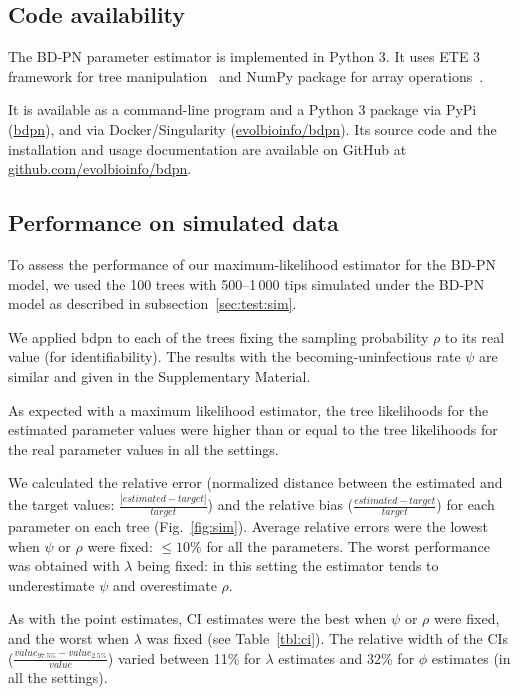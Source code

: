 \documentclass[a4paper,10pt]{article}
\begin{document}
\subsection*{Code availability}
The BD-PN parameter estimator is implemented in Python 3. It uses ETE 3 framework for tree manipulation~\citep{Huerta-Cepas2016} and NumPy package for array operations~\citep{harris_array_2020}. 

It is available as a command-line program and a Python 3 package via PyPi (\href{https://pypi.org/project/bdpn}{bdpn}), and via Docker/Singularity (\href{https://hub.docker.com/r/evolbioinfo/bdpn/tags}{evolbioinfo/bdpn}). Its source code and the installation and usage documentation are available on GitHub at \href{https://github.com/evolbioinfo/bdpn}{github.com/evolbioinfo/bdpn}.

\subsection{Performance on simulated data}

To assess the performance of our maximum-likelihood estimator for the BD-PN model, we used the 100 trees with 500--1\,000 tips simulated under the BD-PN model as described in subsection~\ref{sec:test:sim}.

We applied bdpn to each of the trees fixing the sampling probability $\rho$ to its real value (for identifiability). The results with the becoming-uninfectious rate $\psi$ are similar and given in the Supplementary Material.


As expected with a maximum likelihood estimator, the tree likelihoods for the estimated parameter values were higher than or equal to the tree likelihoods for the real parameter values in all the settings.

We calculated the relative error (normalized distance between the estimated and the target values: $\frac{|estimated - target|}{target}$) and the relative bias ($\frac{estimated - target}{target}$) for each parameter on each tree (Fig.~\ref{fig:sim}). 
Average relative errors were the lowest when $\psi$ or $\rho$ were fixed: $\leq 10\%$  for all the parameters. The worst performance was obtained with $\lambda$ being fixed: in this setting the estimator tends to underestimate $\psi$ and overestimate $\rho$.

As with the point estimates, CI estimates were the best when $\psi$ or $\rho$ were fixed, and the worst when $\lambda$ was fixed (see Table~\ref{tbl:ci}). The relative width of the CIs ($\frac{value_{97.5\%} - value_{2.5\%}}{value}$) varied between 11\% for $\lambda$ estimates and 32\% for $\phi$ estimates (in all the settings).
\end{document}
